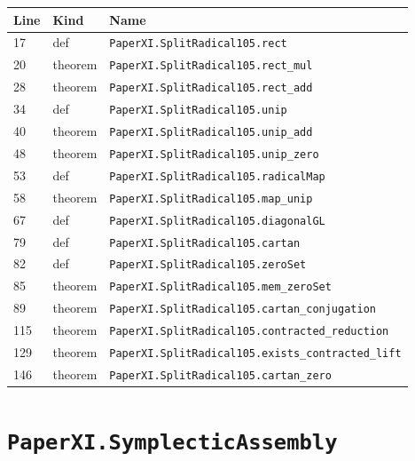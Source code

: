 \documentclass[10pt,oneside]{book}
\begin{document}
\begin{longtable}{@{}p{}p{}p{}@{}}\toprule Line&Kind&Name\\\midrule\endhead

17&def&\nolinkurl{PaperXI.SplitRadical105.rect}\\

20&theorem&\nolinkurl{PaperXI.SplitRadical105.rect_mul}\\

28&theorem&\nolinkurl{PaperXI.SplitRadical105.rect_add}\\

34&def&\nolinkurl{PaperXI.SplitRadical105.unip}\\

40&theorem&\nolinkurl{PaperXI.SplitRadical105.unip_add}\\

48&theorem&\nolinkurl{PaperXI.SplitRadical105.unip_zero}\\

53&def&\nolinkurl{PaperXI.SplitRadical105.radicalMap}\\

58&theorem&\nolinkurl{PaperXI.SplitRadical105.map_unip}\\

67&def&\nolinkurl{PaperXI.SplitRadical105.diagonalGL}\\

79&def&\nolinkurl{PaperXI.SplitRadical105.cartan}\\

82&def&\nolinkurl{PaperXI.SplitRadical105.zeroSet}\\

85&theorem&\nolinkurl{PaperXI.SplitRadical105.mem_zeroSet}\\

89&theorem&\nolinkurl{PaperXI.SplitRadical105.cartan_conjugation}\\

115&theorem&\nolinkurl{PaperXI.SplitRadical105.contracted_reduction}\\

129&theorem&\nolinkurl{PaperXI.SplitRadical105.exists_contracted_lift}\\

146&theorem&\nolinkurl{PaperXI.SplitRadical105.cartan_zero}\\

\bottomrule\end{longtable}

\section{\texorpdfstring{\nolinkurl{PaperXI.SymplecticAssembly}}{PaperXI.SymplecticAssembly}}\label{module:PaperXI.SymplecticAssembly}
\end{document}

